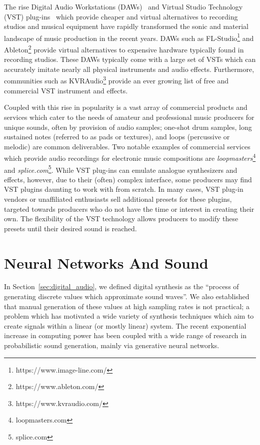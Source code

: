 \documentclass[\main/thesis.tex]{subfiles}
\begin{document}
 The rise Digital Audio Workstations (DAWs)~\cite{leider2004digital} and Virtual Studio Technology (VST) plug-ins~\cite{tanev2013virtual} which provide cheaper and virtual alternatives to recording studios and musical equipment have rapidly transformed the sonic and material landscape of music production in the recent years. DAWs such as FL-Studio\footnote{https://www.image-line.com/} and Ableton\footnote{https://www.ableton.com/} provide virtual alternatives to expensive hardware typically found in recording studios. These DAWs typically come with a large set of VSTs which can accurately imitate nearly all physical instruments and audio effects. Furthermore, communities such as KVRAudio\footnote{https://www.kvraudio.com/} provide an ever growing list of free and commercial VST instrument and effects.
 
 Coupled with this rise in popularity is a vast array of commercial products and services which cater to the needs of amateur and professional music producers for unique sounds, often by provision of audio samples; one-shot drum samples, long sustained notes (referred to as pads or textures), and loops (percussive or melodic) are common deliverables. Two notable examples of commercial services which provide audio recordings for electronic music compositions are \textit{loopmasters}\footnote{loopmasters.com} and \textit{splice.com}\footnote{splice.com}. While VST plug-ins can emulate analogue synthesizers and effects,  however,  due to their (often) complex interface, some producers may find VST plugins daunting to work with from scratch. In many cases, VST plug-in vendors or unaffiliated enthusiasts sell additional presets for these plugins, targeted towards producers who do not have the time or interest in creating their own. The flexibility of the VST technology allows producers to modify these presets until their desired sound is reached.
 
\section{Neural Networks And Sound}
\label{bg:NN}
In Section~\ref{sec:digital_audio}, we defined digital synthesis as the \enquote{process of generating discrete values which approximate sound waves}. We also established that manual generation of these values at high sampling rates is not practical; a problem which has motivated a wide variety of synthesis techniques which aim to create signals within a linear (or mostly linear) system. The recent exponential increase in computing power has been coupled with a wide range of research in probabilistic sound generation, mainly via generative neural networks. 
\end{document}
